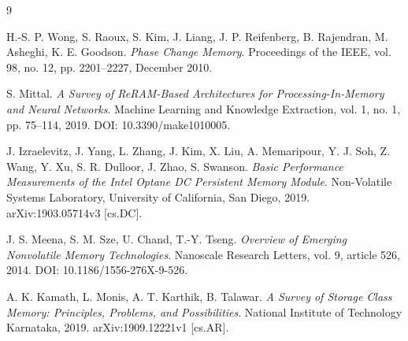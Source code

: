 \documentclass[12pt,a4paper]{article}
\begin{document}
\begin{thebibliography}{9}

H.-S. P. Wong, S. Raoux, S. Kim, J. Liang, J. P. Reifenberg, B. Rajendran, M. Asheghi, K. E. Goodson.
\textit{Phase Change Memory}.
Proceedings of the IEEE, vol. 98, no. 12, pp. 2201--2227, December 2010.

S. Mittal.
\textit{A Survey of ReRAM-Based Architectures for Processing-In-Memory and Neural Networks}.
Machine Learning and Knowledge Extraction, vol. 1, no. 1, pp. 75--114, 2019.
DOI: 10.3390/make1010005.

J. Izraelevitz, J. Yang, L. Zhang, J. Kim, X. Liu, A. Memaripour, Y. J. Soh, Z. Wang, Y. Xu, S. R. Dulloor, J. Zhao, S. Swanson.
\textit{Basic Performance Measurements of the Intel Optane DC Persistent Memory Module}.
Non-Volatile Systems Laboratory, University of California, San Diego, 2019.
arXiv:1903.05714v3 [cs.DC].

J. S. Meena, S. M. Sze, U. Chand, T.-Y. Tseng.
\textit{Overview of Emerging Nonvolatile Memory Technologies}.
Nanoscale Research Letters, vol. 9, article 526, 2014.
DOI: 10.1186/1556-276X-9-526.

A. K. Kamath, L. Monis, A. T. Karthik, B. Talawar.
\textit{A Survey of Storage Class Memory: Principles, Problems, and Possibilities}.
National Institute of Technology Karnataka, 2019.
arXiv:1909.12221v1 [cs.AR].

\end{thebibliography}
\end{document}
